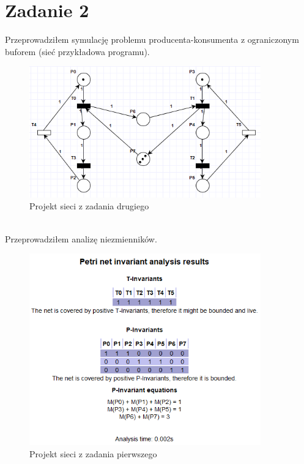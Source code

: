 \documentclass{article}
\begin{document}
    \section{Zadanie 2}
        Przeprowadziłem symulację problemu producenta-konsumenta z ograniczonym buforem (sieć przykładowa programu).
        \begin{figure}[h!]
            \centering
            \includegraphics[width=10cm]{lab6/n2.png}
            \caption{Projekt sieci z zadania drugiego}
        \end{figure}\\
        Przeprowadziłem analizę niezmienników.
        \begin{figure}[h!]
            \centering
            \includegraphics[width=10cm]{lab6/n2_1.png}
            \caption{Projekt sieci z zadania pierwszego}
        \end{figure}\\

        

        
\end{document}
